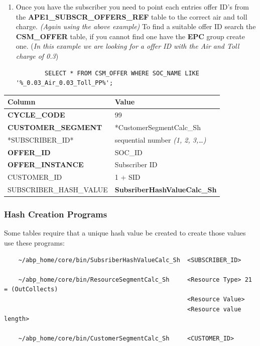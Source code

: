 \documentclass[12pt,twoside]{article}
\begin{document}
   \normalsize
\begin{enumerate}
\item Once you have the subscriber you need to point each entries offer ID's from 
       the \textbf{APE1\_SUBSCR\_OFFERS\_REF} table to the correct air and toll charge. \emph{(Again using the above example)}
       To find a suitable offer ID search the \textbf{CSM\_OFFER} table, if you cannot find one have the \textbf{EPC} group create one. (\emph{In this example we are looking for a offer ID with the Air and Toll charge of 0.3})
\begin{verbatim}
        SELECT * FROM CSM_OFFER WHERE SOC_NAME LIKE '%_0.03_Air_0.03_Toll_PP%';
\end{verbatim}
\end{enumerate}
   \footnotesize

\begin{center}
\begin{tabular}{ll}
\hline
 \textbf{Column}             &  \textbf{Value}                        \\
\hline
 \textbf{CYCLE\_CODE}        &  99                                    \\
 \textbf{CUSTOMER\_SEGMENT}  &  *CustomerSegmentCalc\_Sh              \\
 *SUBSCRIBER\_ID*            &  sequential number \emph{(1, 2, 3,…)}  \\
 \textbf{OFFER\_ID}          &  SOC\_ID                               \\
 \textbf{OFFER\_INSTANCE}    &  Subscriber ID                         \\
 CUSTOMER\_ID                &  1 + SID                               \\
 SUBSCRIBER\_HASH\_VALUE     &  \textbf{SubsriberHashValueCalc\_Sh}   \\
\hline
\end{tabular}
\end{center}


   \normalsize
\subsubsection{Hash Creation Programs}
\label{sec-9-16-3}

   Some tables require that a unique hash value be created to create those values use these programs:
\begin{verbatim}
    ~/abp_home/core/bin/SubsriberHashValueCalc_Sh  <SUBSCRIBER_ID>
   
    ~/abp_home/core/bin/ResourceSegmentCalc_Sh     <Resource Type> 21 = (OutCollects)
                                                   <Resource Value> 
                                                   <Resource value length>
   
    ~/abp_home/core/bin/CustomerSegmentCalc_Sh     <CUSTOMER_ID>
\end{verbatim}
\end{document}
